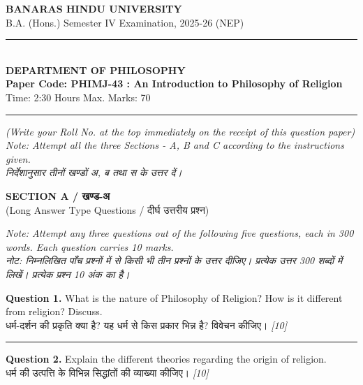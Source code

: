 \documentclass[11pt,a4paper]{article}
\newcommand{\pts}[1]{\hfill \textit{[#1]}}
\begin{document}
\begin{center}
  {\large\bfseries BANARAS HINDU UNIVERSITY}\\[2pt]
  {\normalsize B.A. (Hons.) Semester IV Examination, 2025-26 (NEP)}\\[6pt]
  \rule{0.8\linewidth}{0.5pt}\\[6pt]
  {\large\bfseries DEPARTMENT OF PHILOSOPHY}\\[4pt]
  {\large\bfseries Paper Code: PHIMJ-43 : An Introduction to Philosophy of Religion}\\[4pt]
  {\normalsize Time: 2:30 Hours \hfill Max. Marks: 70}
\end{center}

\rule{\linewidth}{0.4pt}

\smallskip

\noindent \textit{(Write your Roll No. at the top immediately on the receipt of this question paper)}\\[2pt]
\noindent \textit{Note: Attempt all the three Sections - A, B and C according to the instructions given.}\\[1pt]
\noindent \textit{निर्देशानुसार तीनों खण्डों अ, ब तथा स के उत्तर दें।}

\bigskip

\begin{center}
  {\large\bfseries SECTION A / खण्ड-अ}\\[2pt]
  {\normalsize (Long Answer Type Questions / दीर्घ उत्तरीय प्रश्न)}
\end{center}

\noindent \textit{Note: Attempt any three questions out of the following five questions, each in 300 words. Each question carries 10 marks.}\\[2pt]
\noindent \textit{नोट: निम्नलिखित पाँच प्रश्नों में से किसी भी तीन प्रश्नों के उत्तर दीजिए। प्रत्येक उत्तर 300 शब्दों में लिखें। प्रत्येक प्रश्न 10 अंक का है।}

\bigskip

\noindent \textbf{Question 1.} What is the nature of Philosophy of Religion? How is it different from religion? Discuss.\\[1pt]
धर्म-दर्शन की प्रकृति क्या है? यह धर्म से किस प्रकार भिन्न है? विवेचन कीजिए। \pts{10}

\medskip\rule{\linewidth}{0.2pt}\medskip

\noindent \textbf{Question 2.} Explain the different theories regarding the origin of religion.\\[1pt]
धर्म की उत्पत्ति के विभिन्न सिद्धांतों की व्याख्या कीजिए। \pts{10}
\end{document}
